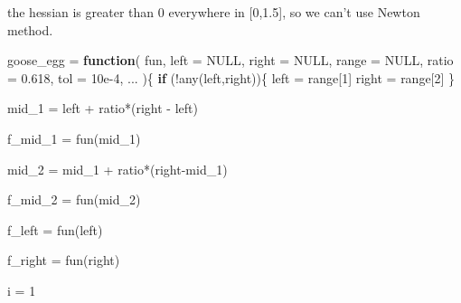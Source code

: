 \documentclass[
]{article}
\newenvironment{Shaded}{\begin{snugshade}}{\end{snugshade}}
\newcommand{\AttributeTok}[1]{\textcolor[rgb]{0.77,0.63,0.00}{#1}}
\newcommand{\ConstantTok}[1]{\textcolor[rgb]{0.00,0.00,0.00}{#1}}
\newcommand{\ControlFlowTok}[1]{\textcolor[rgb]{0.13,0.29,0.53}{\textbf{#1}}}
\newcommand{\DecValTok}[1]{\textcolor[rgb]{0.00,0.00,0.81}{#1}}
\newcommand{\FloatTok}[1]{\textcolor[rgb]{0.00,0.00,0.81}{#1}}
\newcommand{\FunctionTok}[1]{\textcolor[rgb]{0.00,0.00,0.00}{#1}}
\newcommand{\NormalTok}[1]{#1}
\newcommand{\OtherTok}[1]{\textcolor[rgb]{0.56,0.35,0.01}{#1}}
\newcommand{\SpecialCharTok}[1]{\textcolor[rgb]{0.00,0.00,0.00}{#1}}
\begin{document}
the hessian is greater than 0 everywhere in {[}0,1.5{]}, so we can't use
Newton method.

\begin{Shaded}
\begin{Highlighting}[]
\NormalTok{goose\_egg }\OtherTok{=} 
  \ControlFlowTok{function}\NormalTok{(}
\NormalTok{    fun,}
    \AttributeTok{left =} \ConstantTok{NULL}\NormalTok{,}
    \AttributeTok{right =} \ConstantTok{NULL}\NormalTok{,}
    \AttributeTok{range =} \ConstantTok{NULL}\NormalTok{,}
    \AttributeTok{ratio =} \FloatTok{0.618}\NormalTok{,}
    \AttributeTok{tol =} \FloatTok{10e{-}4}\NormalTok{,}
\NormalTok{    ...}
\NormalTok{  )\{}
    \ControlFlowTok{if}\NormalTok{ (}\SpecialCharTok{!}\FunctionTok{any}\NormalTok{(left,right))\{}
\NormalTok{      left }\OtherTok{=}\NormalTok{ range[}\DecValTok{1}\NormalTok{]}
\NormalTok{      right }\OtherTok{=}\NormalTok{ range[}\DecValTok{2}\NormalTok{]}
\NormalTok{    \}}
    
\NormalTok{    mid\_1 }\OtherTok{=}\NormalTok{ left }\SpecialCharTok{+}\NormalTok{ ratio}\SpecialCharTok{*}\NormalTok{(right }\SpecialCharTok{{-}}\NormalTok{ left)}
    
\NormalTok{    f\_mid\_1 }\OtherTok{=} \FunctionTok{fun}\NormalTok{(mid\_1)}
    
\NormalTok{    mid\_2 }\OtherTok{=}\NormalTok{ mid\_1 }\SpecialCharTok{+}\NormalTok{ ratio}\SpecialCharTok{*}\NormalTok{(right}\SpecialCharTok{{-}}\NormalTok{mid\_1)}
    
\NormalTok{    f\_mid\_2 }\OtherTok{=} \FunctionTok{fun}\NormalTok{(mid\_2)}
    
\NormalTok{    f\_left }\OtherTok{=} \FunctionTok{fun}\NormalTok{(left)}
    
\NormalTok{    f\_right }\OtherTok{=} \FunctionTok{fun}\NormalTok{(right)}
    
\NormalTok{    i }\OtherTok{=} \DecValTok{1}
    

\end{Highlighting}
\end{Shaded}
\end{document}
